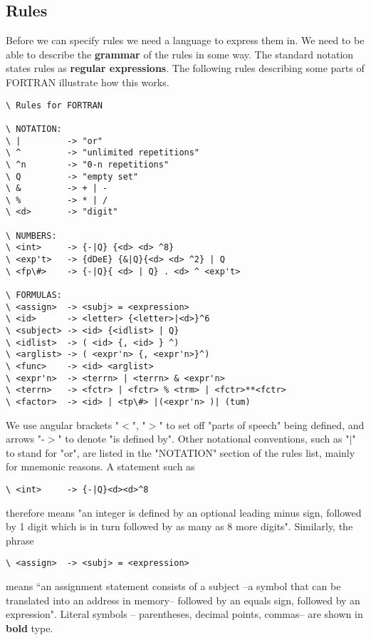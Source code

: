 \subsection{Rules}
Before we can specify rules we need a language to express them in. We need to be able to describe the \textbf{grammar} of the rules in some way. The standard notation states rules as \textbf{regular expressions}. The following rules describing some parts of FORTRAN illustrate how this works.

\begin{verbatim}
\ Rules for FORTRAN

\ NOTATION:
\ |         -> "or"
\ ^         -> "unlimited repetitions"
\ ^n        -> "0-n repetitions"
\ Q         -> "empty set"
\ &         -> + | -
\ %         -> * | /
\ <d>       -> "digit"

\ NUMBERS:
\ <int>     -> {-|Q} {<d> <d> ^8}
\ <exp't>   -> {dDeE} {&|Q}{<d> <d> ^2} | Q
\ <fp\#>    -> {-|Q}{ <d> | Q} . <d> ^ <exp't>

\ FORMULAS:
\ <assign>  -> <subj> = <expression>
\ <id>      -> <letter> {<letter>|<d>}^6
\ <subject> -> <id> {<idlist> | Q}
\ <idlist>  -> ( <id> {, <id> } ^)
\ <arglist> -> ( <expr'n> {, <expr'n>}^)
\ <func>    -> <id> <arglist>
\ <expr'n>  -> <terrn> | <terrn> & <expr'n>
\ <terrn>   -> <fctr> | <fctr> % <trm> | <fctr>**<fctr>
\ <factor>  -> <id> | <tp\#> |(<expr'n> )| (tum)

\end{verbatim}

We use angular brackets "$<$", "$>$" to set off "parts of speech" being defined, and arrows "-$>$" to denote "is defined by". Other notational conventions, such as "$|$" to stand for "or", are listed in the "NOTATION" section of the rules list, mainly for mnemonic reasons. A statement such as

\begin{verbatim}
\ <int>     -> {-|Q}<d><d>^8
\end{verbatim}

therefore means "an integer is defined by an optional leading minus sign, followed by 1 digit which is in turn followed by as many as 8 more digits". Similarly, the phrase

\begin{verbatim}
\ <assign>  -> <subj> = <expression>
\end{verbatim}

means “an assignment statement consists of a subject --a symbol that can be translated into an address in memory-- followed by an equals sign, followed by an expression". Literal symbols -- parentheses, decimal points, commas-- are shown in \textbf{bold} type.

